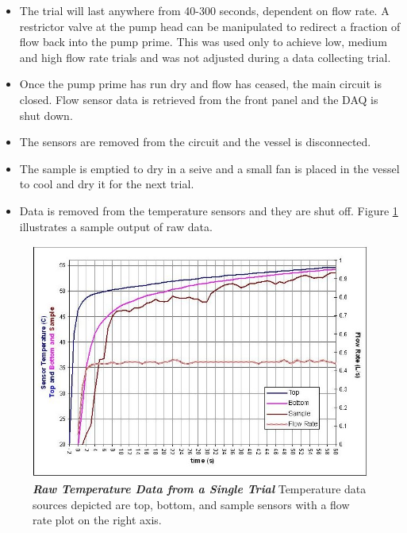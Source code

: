 \documentclass[12pt]{article}
\numberwithin{equation}{section}
\numberwithin{table}{section}
\numberwithin{figure}{section}
\begin{document}
\begin{itemize}
 \item The trial will last anywhere from 40-300 seconds, dependent on flow rate. A restrictor valve at the pump head can be manipulated to redirect a fraction of flow back into the pump prime. This was used only to achieve low, medium and high flow rate trials and was not adjusted during a data collecting trial.
 \item Once the pump prime has run dry and flow has ceased, the main circuit is closed. Flow sensor data is retrieved from the front panel and the DAQ is shut down.
 \item The sensors are removed from the circuit and the vessel is disconnected.
 \item The sample is emptied to dry in a seive and a small fan is placed in the vessel to cool and dry it for the next trial.
 \item Data is removed from the temperature sensors and they are shut off. Figure \ref{rawTemps} illustrates a sample output of raw data.
\end{itemize}
\begin{landscape}
\begin{figure}
\begin{center}
\includegraphics[scale=.65]{rawTemps.JPG}
\caption[Raw Temperature Plot]{\textbf{\emph{Raw Temperature Data from a Single Trial}} Temperature data sources depicted are top, bottom, and sample sensors with a flow rate plot on the right axis.\label{rawTemps}}
\end{center}
\end{figure}
\end{landscape}
\end{document}
